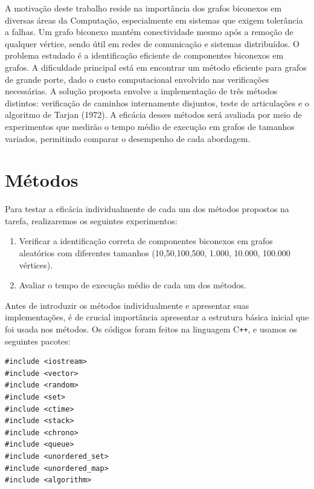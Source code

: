 \documentclass[10pt,conference]{IEEEtran}
\begin{document}
A motivação deste trabalho reside na importância dos grafos biconexos em diversas áreas da Computação, especialmente em sistemas que exigem tolerância a falhas. Um grafo biconexo mantém conectividade mesmo após a remoção de qualquer vértice, sendo útil em redes de comunicação e sistemas distribuídos. O problema estudado é a identificação eficiente de componentes biconexos em grafos. A dificuldade principal está em encontrar um método eficiente para grafos de grande porte, dado o custo computacional envolvido nas verificações necessárias. A solução proposta envolve a implementação de três métodos distintos: verificação de caminhos internamente disjuntos, teste de articulações e o algoritmo de Tarjan (1972). A eficácia desses métodos será avaliada por meio de experimentos que medirão o tempo médio de execução em grafos de tamanhos variados, permitindo comparar o desempenho de cada abordagem.

\section{Métodos}

Para testar a eficácia individualmente de cada um dos métodos propostos na tarefa, realizaremos os seguintes experimentos:

\begin{enumerate}
\item Verificar a identificação correta de componentes biconexos em grafos aleatórios com diferentes tamanhos (10,50,100,500, 1.000, 10.000, 100.000 vértices).
\item Avaliar o tempo de execução médio de cada um dos métodos.
\end{enumerate}

\newpage

Antes de introduzir os métodos individualmente e apresentar suas implementações, é de crucial importância apresentar a estrutura básica inicial que foi usada nos métodos. Os códigos foram feitos na linguagem C\texttt{++}, e usamos os seguintes pacotes:

\begin{verbatim}
#include <iostream>
#include <vector>
#include <random>
#include <set>
#include <ctime>
#include <stack>
#include <chrono>
#include <queue>
#include <unordered_set>
#include <unordered_map>
#include <algorithm>
\end{verbatim}
\end{document}

